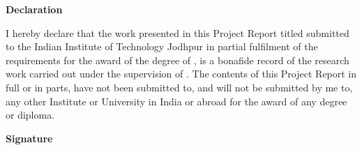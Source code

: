 \begin{flushright}
\huge{\textbf{Declaration}}
\end{flushright}
I hereby declare that the work presented in this Project Report titled \ttitle{} submitted to the Indian Institute of Technology Jodhpur in partial fulfilment of the requirements for the award of the degree of \degree, is a bonafide record of the research work carried out under the supervision of \supname. The contents of this Project Report in full or in parts, have not been submitted to, and will not be submitted by me to, any other Institute or University in India or abroad for the award of any degree or diploma.
\vspace{2cm}
\begin{flushright}
\large{\textbf{Signature}}\\
\emph{\authorname}\\
\rn
\end{flushright}